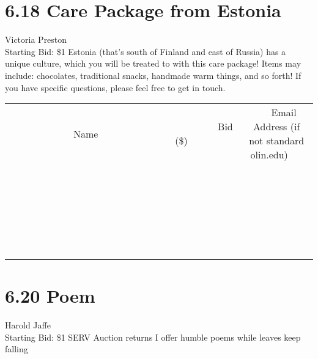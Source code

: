 \documentclass[11pt]{article}
\begin{document}
\section*{6.18 Care Package from Estonia}
Victoria Preston
\\
Starting Bid: \$1
\newline
Estonia (that's south of Finland and east of Russia) has a unique culture, which you will be treated to with this care package! Items may include: chocolates, traditional snacks, handmade warm things, and so forth! If you have specific questions, please feel free to get in touch.
\\[6ex]
\begin{tabular}{c c c}
~~~~~~~~~~~~~Name~~~~~~~~~~~~~ & ~~~~~~~~~Bid (\$)~~~~~~~~~  & ~~~Email Address (if not standard olin.edu)~~~\\
 & & \\
\hline
 & & \\
\hline
 & & \\
\hline
 & & \\
\hline
 & & \\
\hline
 & & \\
\hline
 & & \\
\hline
 & & \\
\hline
 & & \\
\hline
 & & \\
\hline
 & & \\
\hline
 & & \\
\hline
 & & \\
\hline
 & & \\
\hline
 & & \\
\hline
 & & \\
\hline
 & & \\
\hline
 & & \\
\hline
 & & \\
\hline
 & & \\
\hline
 & & \\
\hline
 & & \\
\hline
 & & \\
\hline
 & & \\
\hline
 & & \\
\hline
 & & \\
\hline
\end{tabular}
\newpage
\section*{6.20 Poem}
Harold Jaffe
\\
Starting Bid: \$1
\newline
SERV Auction returns
I offer humble poems
while leaves keep falling
\end{document}
